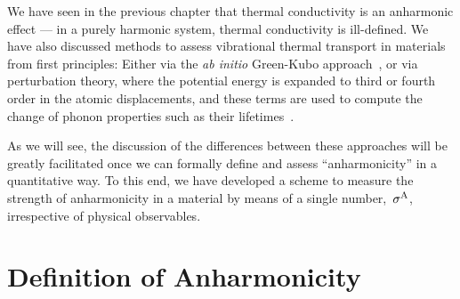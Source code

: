 \label{chp:anharmonicity}


We have seen in the previous chapter that thermal conductivity is an anharmonic effect --- in a purely harmonic system, thermal conductivity is ill-defined. We have also discussed methods to assess vibrational thermal transport in materials from first principles: Either via the \emph{ab initio} Green-Kubo approach~\cite{Marcolongo.2016,Carbogno.2016}, or via perturbation theory, where the potential energy is expanded to third or fourth order in the atomic displacements, and these terms are used to compute the change of phonon properties such as their lifetimes~\cite{Broido.2007,Simoncelli.2019,Isaeva.2019,Feng.2016,Feng.2017,Ravichandran.2018,Xia.2018}.

As we will see, the discussion of the differences between these approaches will be greatly facilitated once we can formally define and assess ``anharmonicity'' in a quantitative way. To this end, we have developed a scheme to measure the strength of anharmonicity in a material by means of a single number,~$\sigma^\mathrm{A}$, irrespective of physical observables.



\section{Definition of Anharmonicity}

